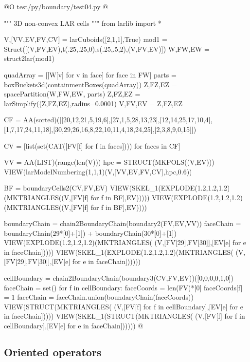 \documentclass[11pt,oneside]{article}	%
\begin{document}
@O test/py/boundary/test04.py
@{""" 3D non-convex LAR cells """
from larlib import *

V,[VV,EV,FV,CV] = larCuboids([2,1,1],True)
mod1 = Struct([(V,FV,EV),t(.25,.25,0),s(.25,.5,2),(V,FV,EV)])
W,FW,EW = struct2lar(mod1)

quadArray = [[W[v] for v in face] for face in FW]
parts = boxBuckets3d(containmentBoxes(quadArray))
Z,FZ,EZ = spacePartition(W,FW,EW, parts)
Z,FZ,EZ = larSimplify((Z,FZ,EZ),radius=0.0001)
V,FV,EV = Z,FZ,EZ

CF = AA(sorted)([[20,12,21,5,19,6],[27,1,5,28,13,23],[12,14,25,17,10,4],
[1,7,17,24,11,18],[30,29,26,16,8,22,10,11,4,18,24,25],[2,3,8,9,0,15]])

CV = [list(set(CAT([FV[f]  for f in faces]))) for faces in CF]

VV = AA(LIST)(range(len(V)))
hpc = STRUCT(MKPOLS((V,EV)))
VIEW(larModelNumbering(1,1,1)(V,[VV,EV,FV,CV],hpc,0.6))

BF = boundaryCells2(CV,FV,EV)
VIEW(SKEL_1(EXPLODE(1.2,1.2,1.2)(MKTRIANGLES((V,[FV[f] for f in BF],EV)))))
VIEW(EXPLODE(1.2,1.2,1.2)(MKTRIANGLES((V,[FV[f] for f in BF],EV))))

boundaryChain = chain2BoundaryChain(boundary2(FV,EV,VV))
faceChain = boundaryChain(29*[0]+[1]) + boundaryChain(30*[0]+[1])
VIEW(EXPLODE(1.2,1.2,1.2)(MKTRIANGLES(
    (V,[FV[29],FV[30]],[EV[e] for e in faceChain]))))
VIEW(SKEL_1(EXPLODE(1.2,1.2,1.2)(MKTRIANGLES(
    (V,[FV[29],FV[30]],[EV[e] for e in faceChain])))))

cellBoundary = chain2BoundaryChain(boundary3(CV,FV,EV))([0,0,0,0,1,0])
faceChain = set()
for f in cellBoundary: 
    faceCoords = len(FV)*[0]
    faceCoords[f] = 1
    faceChain = faceChain.union(boundaryChain(faceCoords))
VIEW(STRUCT(MKTRIANGLES(
    (V,[FV[f] for f in cellBoundary],[EV[e] for e in faceChain]))))
VIEW(SKEL_1(STRUCT(MKTRIANGLES(
    (V,[FV[f] for f in cellBoundary],[EV[e] for e in faceChain])))))
@}

\subsection{Oriented operators}



\end{document}
